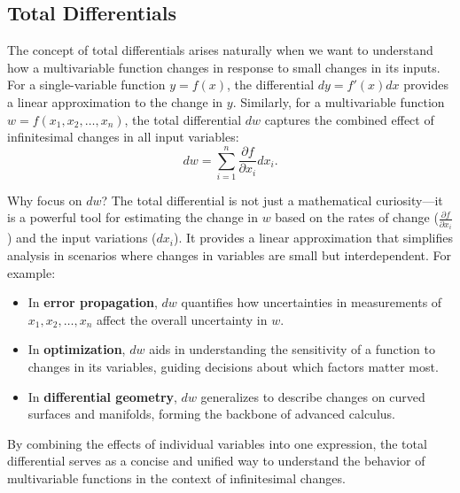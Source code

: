 \subsection*{Total Differentials} 

\noindent The concept of total differentials arises naturally when we want to understand how a multivariable function changes in response to small changes in its inputs. For a single-variable function \( y = f(x) \), the differential \( dy = f'(x) dx \) provides a linear approximation to the change in \( y \). Similarly, for a multivariable function \( w = f(x_1, x_2, \ldots, x_n) \), the total differential \( dw \) captures the combined effect of infinitesimal changes in all input variables:
\[
dw = \sum_{i=1}^n \frac{\partial f}{\partial x_i} dx_i.
\]

\noindent Why focus on \( dw \)? The total differential is not just a mathematical curiosity—it is a powerful tool for estimating the change in \( w \) based on the rates of change (\( \frac{\partial f}{\partial x_i} \)) and the input variations (\( dx_i \)). It provides a linear approximation that simplifies analysis in scenarios where changes in variables are small but interdependent. For example:
\begin{itemize}
    \item In \textbf{error propagation}, \( dw \) quantifies how uncertainties in measurements of \( x_1, x_2, \ldots, x_n \) affect the overall uncertainty in \( w \).
    \item In \textbf{optimization}, \( dw \) aids in understanding the sensitivity of a function to changes in its variables, guiding decisions about which factors matter most.
    \item In \textbf{differential geometry}, \( dw \) generalizes to describe changes on curved surfaces and manifolds, forming the backbone of advanced calculus.
\end{itemize}

\noindent By combining the effects of individual variables into one expression, the total differential serves as a concise and unified way to understand the behavior of multivariable functions in the context of infinitesimal changes.


